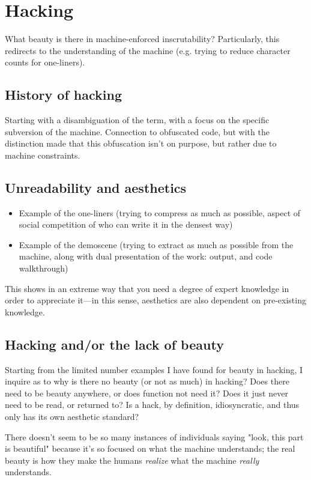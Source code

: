 \documentclass{article}
\begin{document}
\section{Hacking}

What beauty is there in machine-enforced inscrutability? Particularly, this redirects to the understanding of the machine (e.g. trying to reduce character counts for one-liners).

\subsection{History of hacking}

Starting with a disambiguation of the term, with a focus on the specific subversion of the machine. Connection to obfuscated code, but with the distinction made that this obfuscation isn't on purpose, but rather due to machine constraints.

\subsection{Unreadability and aesthetics}

\begin{itemize}
  \item Example of the one-liners (trying to compress as much as possible, aspect of social competition of who can write it in the densest way)
  \item Example of the demoscene (trying to extract as much as possible from the machine, along with dual presentation of the work: output, and code walkthrough)
\end{itemize}

This shows in an extreme way that you need a degree of expert knowledge in order to appreciate it—in this sense, aesthetics are also dependent on pre-existing knowledge.

\subsection{Hacking and/or the lack of beauty}

Starting from the limited number examples I have found for beauty in hacking, I inquire as to why is there no beauty (or not as much) in hacking? Does there need to be beauty anywhere, or does function not need it? Does it just never need to be read, or returned to? Is a hack, by definition, idiosyncratic, and thus only has its own aesthetic standard?

There doesn't seem to be so many instances of individuals saying "look, this part is beautiful" because it's so focused on what the machine understands; the real beauty is how they make the humans \emph{realize} what the machine \emph{really} understands.
\end{document}
